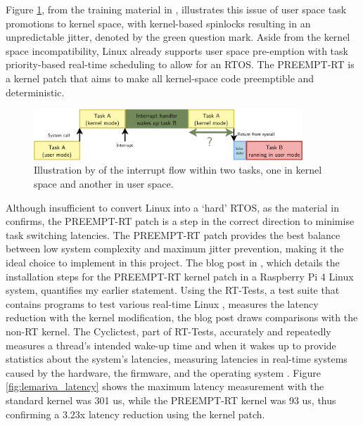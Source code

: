 Figure \ref{fig:bootlin_flow}, from the training material in \cite{bootlinUnderstandingLinuxRealtime2024}, illustrates this issue of user space task promotions to kernel space, with kernel-based spinlocks resulting in an unpredictable jitter, denoted by the green question mark. Aside from the kernel space incompatibility, Linux already supports user space pre-emption with task priority-based real-time scheduling to allow for an RTOS. The PREEMPT-RT is a kernel patch that aims to make all kernel-space code preemptible and deterministic.

\begin{figure}[h]
    \centering
    \includegraphics[width=0.9\textwidth]{assets/bootlin-interrupt-flow.png}
    \caption{Illustration by \cite{bootlinUnderstandingLinuxRealtime2024} of the interrupt flow within two tasks, one in kernel space and another in user space.}
    \label{fig:bootlin_flow}
\end{figure}

Although insufficient to convert Linux into a `hard' RTOS, as the material in \cite{bootlinUnderstandingLinuxRealtime2024} confirms, the PREEMPT-RT patch is a step in the correct direction to minimise task switching latencies. The PREEMPT-RT patch provides the best balance between low system complexity and maximum jitter prevention, making it the ideal choice to implement in this project. The blog post in \cite{maurorivaRaspberryPi4B2019}, which details the installation steps for the PREEMPT-RT kernel patch in a Raspberry Pi 4 Linux system, quantifies my earlier statement. Using the RT-Tests, a test suite that contains programs to test various real-time Linux \cite{costashulRTTests2023}, measures the latency reduction with the kernel modification, the blog post \cite{maurorivaRaspberryPi4B2019} draws comparisons with the non-RT kernel. The Cyclictest, part of RT-Tests, accurately and repeatedly measures a thread's intended wake-up time and when it wakes up to provide statistics about the system's latencies, measuring latencies in real-time systems caused by the hardware, the firmware, and the operating system \cite{costashulCyclictest2023}. Figure \ref{fig:lemariva_latency} shows the maximum latency measurement with the standard kernel was 301 us, while the PREEMPT-RT kernel was 93 us, thus confirming a 3.23x latency reduction using the kernel patch.

